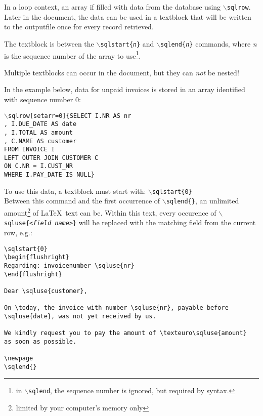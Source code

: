 \documentclass{article}
\newcommand{\bs}{\ensuremath{\backslash}}
\newcommand{\vs}{\vspace{3mm}}
\begin{document}
In a loop context, an array if filled with data from the database using \texttt{\bs sqlrow}.\\
Later in the document, the data can be used in a textblock that will be written to the outputfile once for every record retrieved.

\vs

The textblock is between the \texttt{\bs sqlstart\{\textit{n}\}} and \texttt{\bs sqlend\{\textit{n}\}} commands, where \textit{n} is the sequence number of the array to use\footnote{ in \texttt{\bs sqlend}, the sequence number is ignored, but required by syntax.}.

Multiple textblocks can occur in the document, but they can \textit{not} be nested!

\vs

In the example below, data for unpaid invoices is stored in an array identified with sequence number 0:
 
\texttt{\bs sqlrow[setarr=0]\{SELECT I.NR AS nr\\
\hspace*{15mm},  I.DUE\_DATE AS date\\
\hspace*{15mm},  I.TOTAL AS amount\\
\hspace*{15mm},  C.NAME AS customer\\
\hspace*{15mm}FROM INVOICE I\\
\hspace*{15mm}LEFT OUTER JOIN CUSTOMER C\\
\hspace*{20mm}ON C.NR = I.CUST\_NR\\
\hspace*{15mm}WHERE I.PAY\_DATE IS NULL\}}

\vs

To use this data, a textblock must start with: \texttt{\bs sqlstart\{0\}}\\
Between this command and the first occurrence of \texttt{\bs sqlend\{\}}, an unlimited amount\footnote{ limited by your computer's memory only} of \LaTeX\ text can be. Within this text, every occurence of \texttt{\bs sqluse\{<\textit{field name}>\}} will be replaced with the matching field from the current row, e.g.:

\noindent\begin{verbatim}
\sqlstart{0}
\begin{flushright}
Regarding: invoicenumber \sqluse{nr}
\end{flushright}

Dear \sqluse{customer},

On \today, the invoice with number \sqluse{nr}, payable before
\sqluse{date}, was not yet received by us.

We kindly request you to pay the amount of \texteuro\sqluse{amount}
as soon as possible.

\newpage
\sqlend{}
\end{verbatim}
\end{document}
